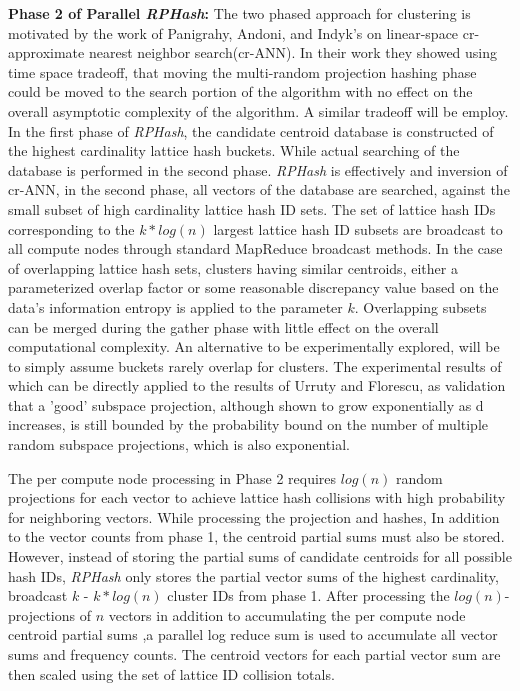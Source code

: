 \documentclass[a4paper,10pt]{article}
\begin{document}
\textbf{Phase 2 of Parallel \emph{RPHash}: } The two phased approach
for clustering is motivated by the work of Panigrahy, Andoni, and
Indyk's\cite{panigrahy,Andoni} on linear-space cr-approximate nearest neighbor
search(cr-ANN).  In their work they showed using time space tradeoff, that
moving the multi-random projection hashing phase could be moved to the search
portion of the algorithm with no effect on the overall asymptotic complexity
of the algorithm.  A similar tradeoff will be employ.  In the first phase of
\emph{RPHash},	the candidate centroid database is constructed of the highest
cardinality lattice hash buckets.  While actual searching of the database is
performed in the second phase.	\emph{RPHash} is effectively and inversion
of cr-ANN, in the second phase, all vectors of the database are searched,
against the small subset of high cardinality lattice hash ID sets.  The set
of lattice hash IDs corresponding to the $k*log(n)$ largest lattice hash ID
subsets are broadcast to all compute nodes through standard MapReduce broadcast
methods.  In the case of overlapping lattice hash sets, clusters having similar
centroids, either a parameterized overlap factor or some reasonable discrepancy
value based on the data's information entropy is applied to the parameter $k$.
Overlapping subsets can be merged during the gather phase with little effect
on the overall computational complexity.  An alternative to be experimentally
explored, will be to simply assume buckets rarely overlap for clusters.
The experimental results of which can be directly applied to the results
of Urruty and Florescu, as validation that a 'good' subspace projection,
although shown to grow exponentially as d increases\cite{florescu09}, is
still bounded by the probability bound on the number of multiple random
subspace projections, which is also exponential\cite{Urruty2007}.

The per compute node processing in Phase 2 requires $log(n)$ random
projections\cite{panigrahy} for each vector to achieve lattice hash collisions
with high probability for neighboring vectors.	While processing the projection
and hashes, In addition to the vector counts from phase 1, the centroid partial
sums must also be stored.  However, instead of storing the partial sums of
candidate centroids for all possible hash IDs, \emph{RPHash} only stores the
partial vector sums of the highest cardinality, broadcast $k$ - $k*log(n)$
cluster IDs from phase 1.  After processing the $log(n)$-projections of $n$
vectors in addition to accumulating the per compute node centroid partial
sums ,a parallel log reduce sum is used to accumulate all vector sums and
frequency counts.  The centroid vectors for each partial vector sum are then
scaled using the set of lattice ID collision totals.
\end{document}
